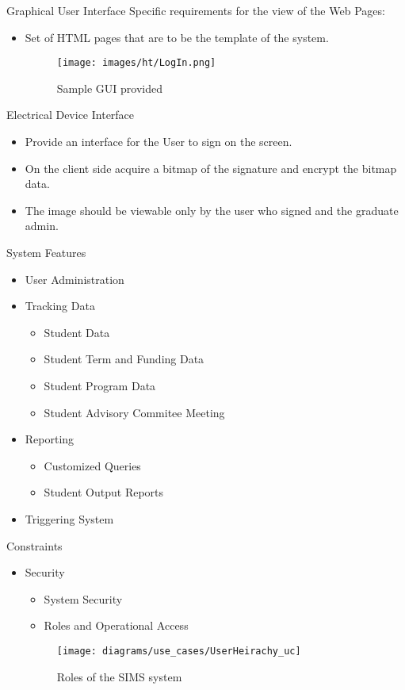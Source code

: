 \documentclass{beamer}
\begin{document}
\begin{frame}{Graphical User Interface}
Specific requirements for the view of the Web Pages:
\begin{itemize}
\item 
Set of HTML pages that are to be the template of the system.
\begin{figure}
\texttt{[image: images/ht/LogIn.png]} \caption{ Sample GUI provided }
\end{figure}
\end{itemize}
\end{frame}


\begin{frame}{Electrical Device Interface}
\begin{itemize}
\item
Provide an interface for the User to sign on the screen.
\item
On the client side acquire a bitmap of the signature and encrypt the bitmap data.
\item 
The image should be viewable only by the user who signed and the graduate admin.
\end{itemize}
\end{frame}

\begin{frame}{System Features}
\begin{itemize}
\item
User Administration
\item
Tracking Data
\begin{itemize}
\item
Student Data
\item
Student Term and Funding Data
\item 
Student Program Data
\item 
Student Advisory Commitee Meeting 
\end{itemize}
\item 
Reporting
\begin{itemize}
\item
Customized Queries
\item 
Student Output Reports
\end{itemize}
\item
Triggering System 
\end{itemize}
\end{frame}

\begin{frame}{Constraints}
\begin{itemize}
\item 
Security 
\begin{itemize}
\item 
System Security
\item
Roles and Operational Access
\end{itemize}
\begin{figure}[!h]
\texttt{[image: diagrams/use\_cases/UserHeirachy\_uc]} \caption{ Roles of the SIMS system } \label{fig:Users}
\end{figure}
\end{itemize}
\end{frame}
\end{document}
